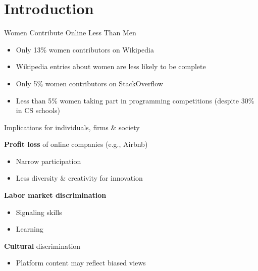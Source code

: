 \section{Introduction}\label{introduction}

\begin{frame}{Women Contribute Online Less Than Men}

\begin{itemize}[<+->]
\tightlist
\item
  Only 13\% women contributors on Wikipedia
\item
  Wikipedia entries about women are less likely to be complete
\item
  Only 5\% women contributors on StackOverflow
\item
  Less than 5\% women taking part in programming competitions (despite
  30\% in CS schools)
\end{itemize}

\end{frame}

\begin{frame}{Implications for individuals, firms \& society}

\textbf{Profit loss} of online companies (e.g., Airbnb)

\begin{itemize}
\tightlist
\item
  Narrow participation
\item
  Less diversity \& creativity for innovation
\end{itemize}

\pause

\textbf{Labor market discrimination}

\begin{itemize}
\tightlist
\item
  Signaling skills
\item
  Learning
\end{itemize}

\pause

\textbf{Cultural} discrimination

\begin{itemize}
\tightlist
\item
  Platform content may reflect biased views
\end{itemize}

\end{frame}


